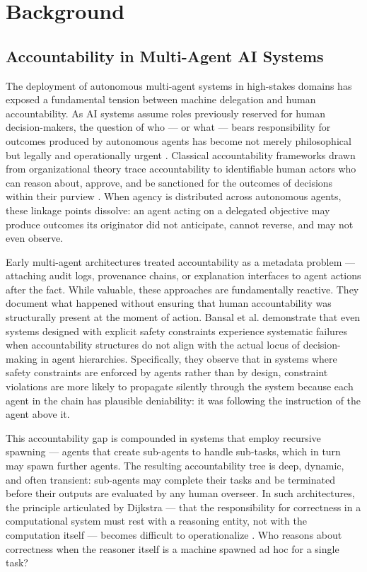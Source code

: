 \section{Background}

\subsection{Accountability in Multi-Agent AI Systems}

The deployment of autonomous multi-agent systems in high-stakes domains has exposed a fundamental tension between machine delegation and human accountability. As AI systems assume roles previously reserved for human decision-makers, the question of who — or what — bears responsibility for outcomes produced by autonomous agents has become not merely philosophical but legally and operationally urgent \cite{dijkstra1982}. Classical accountability frameworks drawn from organizational theory trace accountability to identifiable human actors who can reason about, approve, and be sanctioned for the outcomes of decisions within their purview \cite{wiener1948}. When agency is distributed across autonomous agents, these linkage points dissolve: an agent acting on a delegated objective may produce outcomes its originator did not anticipate, cannot reverse, and may not even observe.

Early multi-agent architectures treated accountability as a metadata problem — attaching audit logs, provenance chains, or explanation interfaces to agent actions after the fact. While valuable, these approaches are fundamentally reactive. They document what happened without ensuring that human accountability was structurally present at the moment of action. Bansal et al. \cite{bansal2019} demonstrate that even systems designed with explicit safety constraints experience systematic failures when accountability structures do not align with the actual locus of decision-making in agent hierarchies. Specifically, they observe that in systems where safety constraints are enforced by agents rather than by design, constraint violations are more likely to propagate silently through the system because each agent in the chain has plausible deniability: it was following the instruction of the agent above it.

This accountability gap is compounded in systems that employ recursive spawning — agents that create sub-agents to handle sub-tasks, which in turn may spawn further agents. The resulting accountability tree is deep, dynamic, and often transient: sub-agents may complete their tasks and be terminated before their outputs are evaluated by any human overseer. In such architectures, the principle articulated by Dijkstra — that the responsibility for correctness in a computational system must rest with a reasoning entity, not with the computation itself — becomes difficult to operationalize \cite{dijkstra1982}. Who reasons about correctness when the reasoner itself is a machine spawned ad hoc for a single task?

